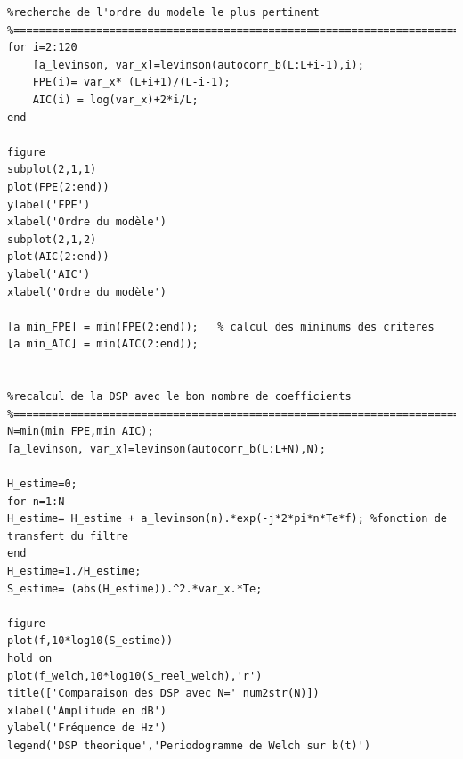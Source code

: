 \documentclass[a4paper]{article}
\begin{document}
\begin{verbatim}
%recherche de l'ordre du modele le plus pertinent
%==========================================================================
for i=2:120
    [a_levinson, var_x]=levinson(autocorr_b(L:L+i-1),i);
    FPE(i)= var_x* (L+i+1)/(L-i-1);
    AIC(i) = log(var_x)+2*i/L;
end

figure
subplot(2,1,1)
plot(FPE(2:end))
ylabel('FPE')
xlabel('Ordre du modèle')
subplot(2,1,2)
plot(AIC(2:end))
ylabel('AIC')
xlabel('Ordre du modèle')

[a min_FPE] = min(FPE(2:end));   % calcul des minimums des criteres
[a min_AIC] = min(AIC(2:end));


%recalcul de la DSP avec le bon nombre de coefficients
%==========================================================================
N=min(min_FPE,min_AIC);
[a_levinson, var_x]=levinson(autocorr_b(L:L+N),N);

H_estime=0;
for n=1:N
H_estime= H_estime + a_levinson(n).*exp(-j*2*pi*n*Te*f); %fonction de transfert du filtre
end
H_estime=1./H_estime;
S_estime= (abs(H_estime)).^2.*var_x.*Te;

figure
plot(f,10*log10(S_estime))
hold on
plot(f_welch,10*log10(S_reel_welch),'r')
title(['Comparaison des DSP avec N=' num2str(N)])
xlabel('Amplitude en dB')
ylabel('Fréquence de Hz')
legend('DSP theorique','Periodogramme de Welch sur b(t)')

\end{verbatim}
\end{document}
